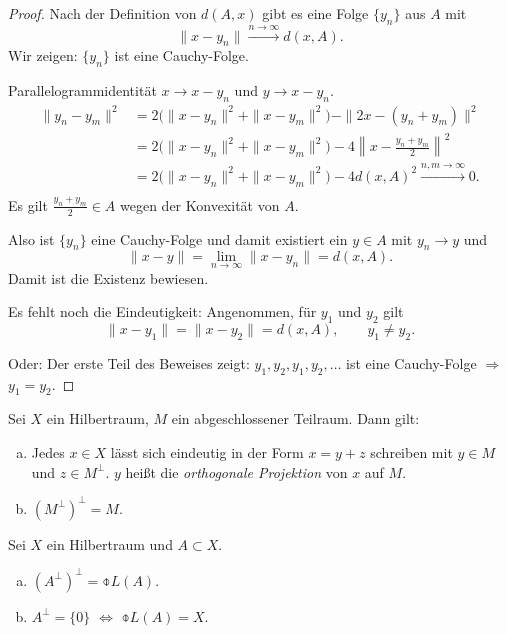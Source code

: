 \documentclass[
 a4paper,
 12pt,
 parskip=half
 ]{scrreprt}
\theoremstyle{plain}
\theoremstyle{definition}
\numberwithin{equation}{section}
\begin{document}
\begin{proof}
  Nach der Definition von $d(A,x)$ gibt es eine Folge $\{y_n\}$ aus $A$ mit
  \[ \| x - y_n \| \xrightarrow{n \to \infty} d(x,A). \]
  Wir zeigen: $\{y_n\}$ ist eine Cauchy-Folge.

  Parallelogrammidentität $x \to x - y_n$ und $y \to x - y_n$.
  \begin{align*}
    \| y_n - y_m \|^2
    &= 2 \big( \|x-y_n\|^2 + \|x-y_m\|^2 \big) - \| 2x - (y_n + y_m) \|^2 \\
    &= 2 \big( \|x-y_n\|^2 + \|x-y_m\|^2 \big)
      - 4 \left\| x - \frac{y_n+y_m}{2} \right\|^2 \\
    &= 2 \big( \|x-y_n\|^2 + \|x-y_m\|^2 \big)
      - 4 d(x,A)^2 \xrightarrow{n,m \to \infty} 0. \\
  \end{align*}
  Es gilt $\frac{y_n+y_m}{2} \in A$ wegen der Konvexität von $A$.

  Also ist $\{y_n\}$ eine Cauchy-Folge und damit existiert ein $y \in A$ mit
  $y_n \to y$ und
  \[ \| x - y \| = \lim_{n \to \infty} \| x - y_n \| = d(x,A). \]
  Damit ist die Existenz bewiesen.

  Es fehlt noch die Eindeutigkeit: Angenommen, für $y_1$ und $y_2$ gilt
  \[ \| x - y_1 \| = \| x - y_2 \| = d(x,A), \qquad y_1 \ne y_2. \]

  Oder: Der erste Teil des Beweises zeigt: $y_1, y_2, y_1, y_2, \ldots$ ist eine
  Cauchy-Folge $\Rightarrow$ $y_1 = y_2$.
\end{proof}

\begin{thm}[Projektionssatz] %
  Sei $X$ ein Hilbertraum, $M$ ein abgeschlossener Teilraum. Dann gilt:
  \begin{enumerate}[a)]
  \item Jedes $x \in X$ lässt sich eindeutig in der Form $x = y + z$ schreiben
    mit $y \in M$ und $z \in M^\perp$. $y$ heißt die \emph{orthogonale
      Projektion} von $x$ auf $M$.
  \item $(M^\perp)^\perp = M$.
  \end{enumerate}
\end{thm}

\begin{aufg} %
  Sei $X$ ein Hilbertraum und $A \subset X$.
  \begin{enumerate}[a)]
  \item $(A^\perp)^\perp = \obar{L(A)}$.
  \item $A^\perp = \{0\}$ $\Leftrightarrow$ $\obar{L(A)} = X$.
  \end{enumerate}
\end{aufg}
\end{document}
